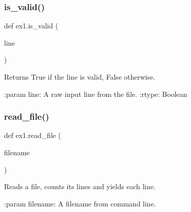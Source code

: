 \subsubsection{\texorpdfstring{is\+\_\+valid()}{is\_valid()}}
{\footnotesize\ttfamily def ex1.\+is\+\_\+valid (\begin{DoxyParamCaption}\item[{}]{line }\end{DoxyParamCaption})}

\begin{DoxyVerb}Returns True if the line is valid, False otherwise.

:param line: A raw input line from the file.
:rtype: Boolean
\end{DoxyVerb}
 \mbox{\label{namespaceex1_a47279d236411a393dd670d53f01534bb}} 
\subsubsection{\texorpdfstring{read\+\_\+file()}{read\_file()}}
{\footnotesize\ttfamily def ex1.\+read\+\_\+file (\begin{DoxyParamCaption}\item[{}]{filename }\end{DoxyParamCaption})}

\begin{DoxyVerb}Reads a file, counts its lines and yields each line.

:param filename: A filename from command line.
\end{DoxyVerb}
 